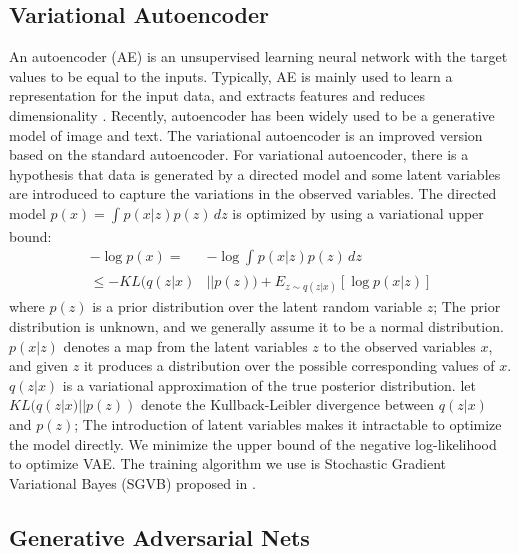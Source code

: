 \documentclass{llncs}
\begin{document}
\subsection{Variational Autoencoder}
An autoencoder (AE) is an unsupervised learning neural network with the target values to be equal to the inputs. Typically, AE is mainly used to learn a representation for the input data, and extracts features and reduces dimensionality \cite{kingma2014auto-encoding}.
Recently, autoencoder has been widely used to be a generative model of image and text. The variational autoencoder is an improved version based on the standard autoencoder. For variational autoencoder, there is a hypothesis that data is generated by a directed model and some latent variables are introduced to capture the variations in the observed variables. The directed model $p(x)=\int_{}^{} p(x|z)p(z)\,dz$ is optimized by using a variational upper bound:
\begin{equation}
\begin{aligned}
-\log p(x) =&- \log \int_{}^{} p(x|z)p(z)\,dz \\
 \leq -KL(q(z|x)&||p(z)) + E_{z\sim q(z|x)}[\log p(x|z)]
\label{eq:pathnode}
 \end{aligned}
\end{equation}
where $p(z)$  is a prior distribution over the latent random variable $z$; The prior distribution is unknown, and we generally assume it to be a normal distribution.
$p(x|z)$ denotes a map from the latent variables $z$ to the observed variables $x$, and given $z$ it produces a distribution over the possible corresponding values of $x$.  $q(z|x)$ is a variational approximation of the true posterior distribution. let $KL(q(z|x)||p(z))$ denote the  Kullback-Leibler divergence between $q(z|x)$ and $p(z)$; The introduction of latent variables makes it intractable to optimize the model directly. We minimize the upper bound of the negative log-likelihood to optimize VAE. The training algorithm we use is Stochastic Gradient Variational Bayes (SGVB) proposed in  \cite{kingma2014auto-encoding}.

\subsection{Generative Adversarial Nets}
\end{document}
